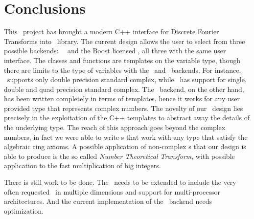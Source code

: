 \section{Conclusions}
This \gsoc\ project has brought a modern C++ interface for Discrete Fourier
Transforms into \boostmath\ library.
The current design allows the user to select from three possible backends:
\gsl\, \fftw\ and the Boost licensed \bsl, all three with the same user
interface. The classes and functions are templates on the variable type, though
there are limits to the type of variables with the \gsl\ and \fftw\ backends.
For instance, \gsl\ supports only double precision standard complex,
while \fftw\ has support for single, double and quad precision standard complex.
The \bsl\ backend, on the other hand, has been written
completely in terms of templates, hence it works for any user provided type that
represents complex numbers. 
The novelty of our \dft\ design lies precisely in
the exploitation of the C++ templates to abstract away the details of the
underlying type. 
The reach of this approach goes beyond the complex numbers, in fact we were able
to write \fft s that work with any type that satisfy the algebraic ring axioms.
A possible application of non-complex \fft s that our design is able to produce
is the so called \emph{Number Theoretical Transform}, with possible application to the
fast multiplication of big integers.


There is still work to be done. The \api\ needs to be extended to include the very
often requested \dft\ in multiple dimensions and support for multi-processor
architectures. And the current implementation of the \bsl\ backend needs
optimization.
